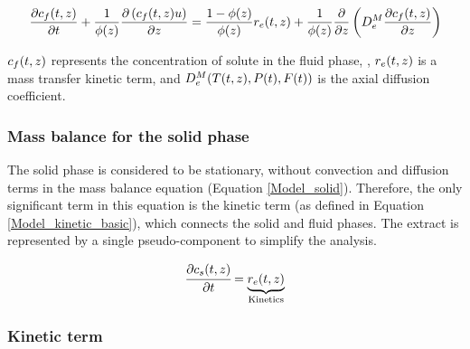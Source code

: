 \documentclass[../Article_Model_Parameters.tex]{subfiles}
\begin{document}
	{\footnotesize
		\begin{equation}
			\label{Model_fluid}
			\frac{\partial {\color{black}c_f}(t,z)}{\partial t}
			+ \frac{1}{{\color{black}\phi}(z)} \frac{\partial \left( {\color{black}c_f}(t,z) u\right)}{\partial {\color{black}z}}
			= \frac{1-{\color{black}\phi}(z)}{{\color{black}\phi}(z)} {\color{black}r_e}(t,z)
			+ \frac{1}{{\color{black}\phi}(z)} \frac{\partial}{\partial {\color{black}z}} \left( {\color{black}D^M_e} \frac{\partial {\color{black}c_f}(t,z)}{\partial {\color{black}z}} \right)
		\end{equation}
	}
	
	${\color{black}c_f}(t,z)$ represents the concentration of solute in the fluid phase, , ${\color{black}r_e}(t,z)$ is a mass transfer kinetic term, and ${\color{black}D^M_e}({\color{black}T}(t,z),{\color{black}P}(t),{\color{black}F}(t))$ is the axial diffusion coefficient.
	
	\subsubsection{Mass balance for the solid phase} \label{Mass_balance_solid}
	
	The solid phase is considered to be stationary, without convection and diffusion terms in the mass balance equation (Equation \ref{Model_solid}). Therefore, the only significant term in this equation is the kinetic term (as defined in Equation \ref{Model_kinetic_basic}), which connects the solid and fluid phases. The extract is represented by a single pseudo-component to simplify the analysis. 
	
	{\footnotesize
		\begin{equation} 
			\label{Model_solid}
					\cfrac{\partial {\color{black}c_s}(t,z)}{\partial t} = \underbrace{ {\color{black}r_e}(t,z) }_{\text{Kinetics}}
			\end{equation} }
			
	\subsubsection{Kinetic term} \label{CH: Kinetic}
	
	
\end{document}
